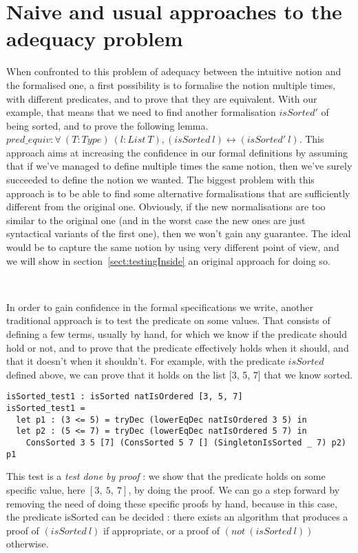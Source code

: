 \section{Naive and usual approaches to the adequacy problem}

\label{sect:naiveApproaches}


When confronted to this problem of adequacy between the intuitive notion and the formalised one, a first possibility is to formalise the notion multiple times, with different predicates, and to prove that they are equivalent.
With our example, that means that we need to find another formalisation $isSorted'$ of being sorted, and to prove the following lemma.
$pred\_equiv : \forall\ (T:Type)\ (l:List\ T), (isSorted\ l) \leftrightarrow (isSorted'\ l)$.
This approach aims at increasing the confidence in our formal definitions by assuming that if we've managed to define multiple times the same notion, then we've surely succeeded to define the notion we wanted. The biggest problem with this approach is to be able to find some alternative formalisations that are sufficiently different from the original one. Obviously, if the new normalisations are too similar to the original one (and in the worst case the new ones are just syntactical variants of the first one), then we won't gain any guarantee. The ideal would be to capture the same notion by using very different point of view, and we will show in section~\ref{sect:testingInside} an original approach for doing so.

\

In order to gain confidence in the formal specifications we write, another traditional approach is to test the predicate on some values. That consists of defining a few terms, usually by hand, for which we know if the predicate should hold or not, and to prove that the predicate effectively holds when it should, and that it doesn't when it shouldn't. For example, with the predicate $isSorted$ defined above, we can prove that it holds on the list [3, 5, 7] that we know sorted.

\begin{lstlisting}
isSorted_test1 : isSorted natIsOrdered [3, 5, 7]
isSorted_test1 = 
  let p1 : (3 <= 5) = tryDec (lowerEqDec natIsOrdered 3 5) in
  let p2 : (5 <= 7) = tryDec (lowerEqDec natIsOrdered 5 7) in
    ConsSorted 3 5 [7] (ConsSorted 5 7 [] (SingletonIsSorted _ 7) p2) p1
\end{lstlisting}
This test is a \emph{test done by proof} : we show that the predicate holds on some specific value, here $[3,\ 5,\ 7]$, by doing the proof. We can go a step forward by removing the need of doing these specific proofs by hand, because in this case, the predicate isSorted can be decided : there exists an algorithm that produces a proof of $(isSorted\ l)$ if appropriate, or a proof of $(not\ (isSorted\ l))$ otherwise.

